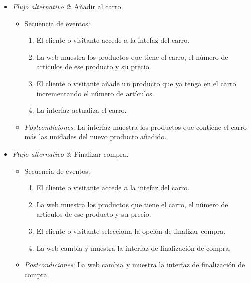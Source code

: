 \begin{enumerate}[{\bf UC-1}]
\begin{itemize}

   \item {\it Flujo alternativo 2}: Añadir al carro.
\begin{itemize}
\item Secuencia de eventos:

    \begin{enumerate}[1. ]
	\item El cliente o visitante accede a la intefaz del carro.
    \item La web muestra los productos que tiene el carro, el número de artículos de ese producto y su precio.
    \item El cliente o visitante añade un producto que ya tenga en el carro incrementando el número de artículos.
    \item  La interfaz actualiza el carro.
    \end{enumerate}
   \item {\it Postcondiciones}: La interfaz muestra los productos que contiene el carro más las unidades del nuevo producto añadido.
\end{itemize}


     \item {\it Flujo alternativo 3}: Finalizar compra.
\begin{itemize}
\item Secuencia de eventos:

    \begin{enumerate}[1. ]
	\item El cliente o visitante accede a la intefaz del carro.
    \item La web muestra los productos que tiene el carro, el número de artículos de ese producto y su precio.
    \item El cliente o visitante selecciona la opción de finalizar compra.
    \item La web cambia y muestra la interfaz de finalización de compra.
    \end{enumerate}
     \item {\it Postcondiciones}: La web cambia y muestra la interfaz de finalización de compra.
\end{itemize}


\end{itemize}
\end{enumerate}
